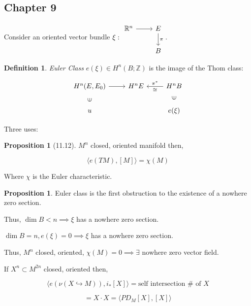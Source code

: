 \documentclass{article}
\theoremstyle{definition}
\newtheorem*{definition}{Definition}
\newtheorem{proposition}[theorem]{Proposition}
\begin{document}
    \subsection*{Chapter 9}

    Consider an oriented vector bundle \(\xi : \begin{tikzcd} \mathbb{R}^n \ar[r] & E \ar[d,"\pi"] \\ & B \end{tikzcd}\).

    \begin{definition}
        \textit{Euler Class} \(e(\xi) \in H^n(B;\mathbb{Z})\) is the image of the Thom class:

        \[
            \begin{tikzcd}
                H^n(E,E_0) \ar[r] & H^n E & H^n B \ar[l,"\pi^{\ast}"',"\cong"] \\ u \ar[u,phantom,"\in", sloped] & & e(\xi) \ar[u,phantom,"\in", sloped]
            \end{tikzcd}
        \]
    \end{definition}

    Three uses:

    \begin{proposition}
        [11.12] \(M^n\) closed, oriented manifold then,

        \[
            \langle e(TM), [M] \rangle = \chi(M)
        \]

        Where \(\chi\) is the Euler characteristic. 
    \end{proposition}

    \begin{proposition}
        Euler class is the first obstruction to the existence of a nowhere zero section.

        Thus, \(\dim B < n \implies \xi\) has a nowhere zero section.

        \(\dim B = n, e(\xi) = 0 \implies \xi\) has a nowhere zero section.

        Thus, \(M^n\) closed, oriented, \(\chi(M) = 0 \implies \exists\) nowhere zero vector field.
    \end{proposition}

    If \(X^n \subset M^{2n}\) closed, oriented then,

    \[
        \langle e(\nu(X \hookrightarrow M)), i_{\ast} [X] \rangle = \text{self intersection \(\#\) of } X
    \]

    \[
        = X \cdot X = \langle PD_M [X], [X] \rangle 
    \]
\end{document}
